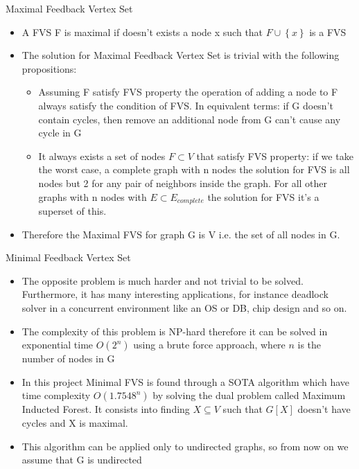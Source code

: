 \documentclass[11pt]{beamer}
\begin{document}
	\begin{frame}{Maximal Feedback Vertex Set}
		\begin{itemize}
			\item A FVS F is maximal if doesn't exists a node x such that $F \cup \left\{ x \right\} $ is a FVS
			\item The solution for Maximal Feedback Vertex Set is trivial with the following propositions:
			\begin{itemize}
				\item Assuming F satisfy FVS property the operation of adding a node to F always satisfy the condition of FVS. In equivalent terms: if G doesn't contain cycles, then remove an additional node from G can't cause any cycle in G 
				\item It always exists a set of nodes $ F \subset V $ that satisfy FVS property: if we take the worst case, a complete graph with n nodes the solution for FVS is all nodes but 2 for any pair of neighbors inside the graph. For all other graphs with n nodes with $ E \subset E_{complete} $ the solution for FVS it's a superset of this.
			\end{itemize}
			\item Therefore the Maximal FVS for graph G is V i.e. the set of all nodes in G.
		\end{itemize}
	\end{frame}
    \begin{frame}{Minimal Feedback Vertex Set}
		\begin{itemize}
			\item The opposite problem is much harder and not trivial to be solved. Furthermore, it has many interesting applications, for instance deadlock solver in a concurrent environment like an OS or DB, chip design and so on.
			\item The complexity of this problem is NP-hard therefore it can be solved in exponential time $O(2^n)$ using a brute force approach, where $ n $ is the number of nodes in G
			\item In this project Minimal FVS is found through a SOTA algorithm \cite{formin} which have time complexity $ O(1.7548^n) $ by solving the dual problem called Maximum Inducted Forest. It consists into finding $ X \subseteq V $ such that $ G\left[ X \right] $ doesn't have cycles and X is maximal. 
			\item This algorithm can be applied only to undirected graphs, so from now on we assume that G is undirected
		\end{itemize}
    \end{frame}
\end{document}
